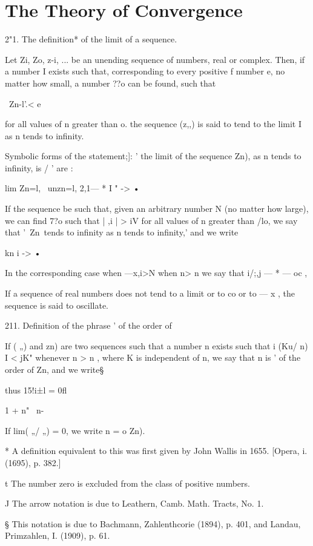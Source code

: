 \chapter{The Theory of Convergence} 

2"1. The definition* of the limit of a sequence.

Let Zi, Zo, z-i, ... be an unending sequence of numbers, real or
complex. Then, if a number I exists such that, corresponding to every
positive f number e, no matter how small, a number ??o can be found,
such that

\ Zn-l'.< e

for all values of n greater than o. the sequence (z,,) is said to tend
to the limit I as n tends to infinity.

Symbolic forms of the statement;]: ' the limit of the sequence Zn), as
n tends to infinity, is / ' are :

lim Zn=l, \ unzn=l, 2,1— * I " -> •

If the sequence be such that, given an arbitrary number N (no matter
how large), we can find 7?o such that | ,i | > iV for all values of n
greater than /lo, we say that '\ Zn\ tends to infinity as n tends to
infinity,' and we write

kn i -> •

In the corresponding case when —x,i>N when n> n we say that i/;,j — *
— oc ,

If a sequence of real numbers does not tend to a limit or to co or to
— x , the sequence is said to oscillate.

211. Definition of the phrase ' of the order of

If ( „) and zn) are two sequences such that a number n exists such
that i (Ku/ n) I < jK" whenever n > n , where K is independent of n,
we say that n is ' of the order of Zn, and we write§

thus 15!i±l = 0fl

1 + n" \ n-

If lim( „/ „) = 0, we write n = o Zn).

* A definition equivalent to this was first given by John Wallis in
1655. [Opera, i. (1695), p. 382.]

t The number zero is excluded from the class of positive numbers.

J The arrow notation is due to Leathern, Camb. Math. Tracts, No. 1.

§ This notation is due to Bachmann, Zahlenthcorie (1894), p. 401, and
Landau, Primzahlen, I. (1909), p. 61.



